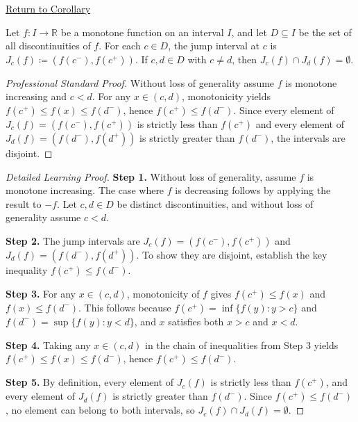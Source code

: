 \newpage
{}
\label{prf:jump-intervals-for-monotone-discontinuities}

\begin{remark*}[Return]
\hyperref[cor:jump-intervals-for-monotone-discontinuities]{Return to Corollary}
\end{remark*}

\begin{corollary*}
Let $f : I \to \mathbb{R}$ be a monotone function on an interval $I$, and let $D \subseteq I$ be the set of all discontinuities of $f$. For each $c \in D$, the jump interval at $c$ is $J_c(f) \coloneqq (f(c^{-}), f(c^{+}))$. If $c, d \in D$ with $c \neq d$, then $J_c(f) \cap J_d(f) = \emptyset$.
\end{corollary*}

\begin{proof}[Professional Standard Proof]
\LRAProofBodyStart
Without loss of generality assume $f$ is monotone increasing and $c < d$. For any $x \in (c, d)$, monotonicity yields $f(c^{+}) \leq f(x) \leq f(d^{-})$, hence $f(c^{+}) \leq f(d^{-})$. Since every element of $J_c(f) = (f(c^{-}), f(c^{+}))$ is strictly less than $f(c^{+})$ and every element of $J_d(f) = (f(d^{-}), f(d^{+}))$ is strictly greater than $f(d^{-})$, the intervals are disjoint.
\end{proof}

\begin{proof}[Detailed Learning Proof]
\LRAProofBodyStart

\textbf{Step 1.} Without loss of generality, assume $f$ is monotone increasing. The case where $f$ is decreasing follows by applying the result to $-f$. Let $c, d \in D$ be distinct discontinuities, and without loss of generality assume $c < d$.

\textbf{Step 2.} The jump intervals are $J_c(f) = (f(c^{-}), f(c^{+}))$ and $J_d(f) = (f(d^{-}), f(d^{+}))$. To show they are disjoint, establish the key inequality $f(c^{+}) \leq f(d^{-})$.

\textbf{Step 3.} For any $x \in (c, d)$, monotonicity of $f$ gives $f(c^{+}) \leq f(x)$ and $f(x) \leq f(d^{-})$. This follows because $f(c^{+}) = \inf\{f(y) : y > c\}$ and $f(d^{-}) = \sup\{f(y) : y < d\}$, and $x$ satisfies both $x > c$ and $x < d$.

\textbf{Step 4.} Taking any $x \in (c, d)$ in the chain of inequalities from Step 3 yields $f(c^{+}) \leq f(x) \leq f(d^{-})$, hence $f(c^{+}) \leq f(d^{-})$.

\textbf{Step 5.} By definition, every element of $J_c(f)$ is strictly less than $f(c^{+})$, and every element of $J_d(f)$ is strictly greater than $f(d^{-})$. Since $f(c^{+}) \leq f(d^{-})$, no element can belong to both intervals, so $J_c(f) \cap J_d(f) = \emptyset$.
\end{proof}

